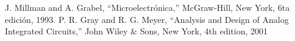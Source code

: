 \documentclass[letterpaper, 10 pt, conference]{ieeeconf}  %
\begin{document}
\addtolength{\textheight}{-12cm}   %
















\begin{thebibliography}{99}

 J. Millman and A. Grabel, ``Microelectrónica,” McGraw-Hill, New York, 6ta edición, 1993.
 P. R. Gray and R. G. Meyer, ``Analysis and Design of Analog Integrated Circuits,” John Wiley & Sons, New York, 4th edition, 2001



\end{thebibliography}
\end{document}
